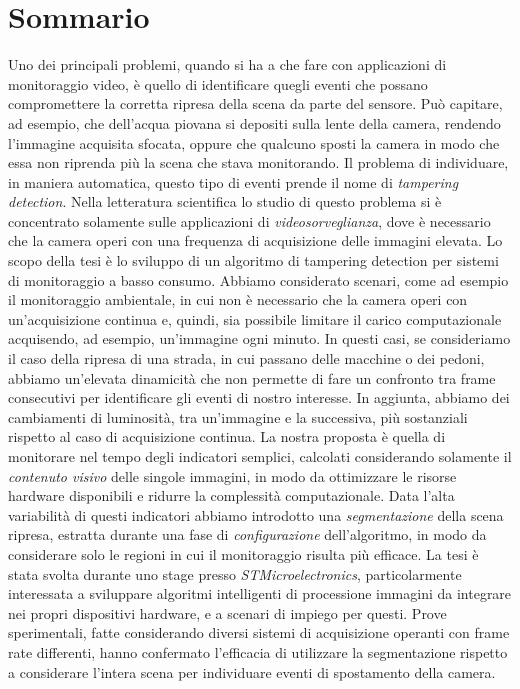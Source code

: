 \newpage
\chapter*{Sommario}


Uno dei principali problemi, quando si ha a che fare con applicazioni di monitoraggio video, \`e quello di identificare quegli eventi che possano compromettere la corretta ripresa della scena da parte del sensore.
Pu\`o capitare, ad esempio, che dell'acqua piovana si depositi sulla lente della camera, rendendo l'immagine acquisita sfocata, oppure che qualcuno sposti la camera in modo che essa non riprenda pi\`u la scena che stava monitorando.
Il problema di individuare, in maniera automatica, questo tipo di eventi prende il nome di \textit{tampering detection}. 
Nella letteratura scientifica lo studio di questo problema si \`e concentrato solamente sulle applicazioni di \textit{videosorveglianza}, dove \`e necessario che la camera operi con una frequenza di acquisizione delle immagini elevata.
Lo scopo della tesi \`e lo sviluppo di un algoritmo di tampering detection per sistemi di monitoraggio a basso consumo. Abbiamo considerato scenari, come ad esempio il monitoraggio ambientale, in cui non \`e necessario che la camera operi con un'acquisizione continua e, quindi, sia possibile limitare il carico computazionale acquisendo, ad esempio, un'immagine ogni minuto.
In questi casi, se consideriamo il caso della ripresa di una strada, in cui passano delle macchine o dei pedoni, abbiamo un'elevata dinamicit\`a che non permette di fare un confronto tra frame consecutivi per identificare gli eventi di nostro interesse. In aggiunta, abbiamo dei cambiamenti di luminosit\`a, tra un'immagine e la successiva, pi\`u sostanziali rispetto al caso di acquisizione continua.  
La nostra proposta \`e quella di monitorare nel tempo degli indicatori semplici, calcolati considerando solamente il \textit{contenuto visivo} delle singole immagini, in modo da ottimizzare le risorse hardware disponibili e ridurre la complessit\`a computazionale.
Data l'alta variabilit\`a di questi indicatori abbiamo introdotto una \textit{segmentazione} della scena ripresa, estratta durante una fase di \textit{configurazione} dell'algoritmo, in modo da considerare solo le regioni in cui il monitoraggio risulta pi\`u efficace.
La tesi \`e stata svolta durante uno stage presso \textit{STMicroelectronics}, particolarmente interessata a sviluppare algoritmi intelligenti di processione immagini da integrare nei propri dispositivi hardware, e a scenari di impiego per questi.
Prove sperimentali, fatte considerando diversi sistemi di acquisizione operanti con frame rate differenti, hanno confermato l'efficacia di utilizzare la segmentazione rispetto a considerare l'intera scena per individuare eventi di spostamento della camera. 